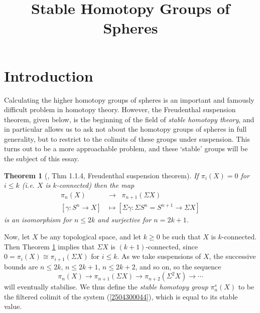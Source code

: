 \documentclass[11pt, titlepage]{article} %
\title{Stable Homotopy Groups of Spheres}
\date{}
\numberwithin{equation}{subsection}
\theoremstyle{plain}
\newtheorem{theorem}{Theorem}[subsection]
\theoremstyle{definition}
\begin{document}
\maketitle


\DeclarePairedDelimiter{\norm}{\lVert}{\rVert} 
\DeclarePairedDelimiter{\abs}{\lvert}{\rvert} 
\DeclarePairedDelimiter{\ang}{\langle}{\rangle} 


\section{Introduction}

Calculating the higher homotopy groups of spheres is an important and famously difficult problem in homotopy theory. However, the Freudenthal suspension theorem, given below, is the beginning of the field of \textit{stable homotopy theory}, and in particular allows us to ask not about the homotopy groups of spheres in full generality, but to restrict to the colimits of these groups under suspension. This turns out to be a more approachable problem, and these `stable' groups will be the subject of this essay. 

\begin{theorem}[{\autocite{cobordism}, Thm 1.1.4}, Freudenthal suspension theorem]\label{2504151046}
If \(\pi_i(X)=0\) for \(i\leq k\) (i.e. \(X\) is \(k\)-connected) then the map 
\begin{align*}
\pi_n(X) \;\;&\to\;\; \pi_{n+1}(\Sigma X)\\
[\gamma : S^n \to X] &\mapsto [\Sigma \gamma : \Sigma S^n=S^{n+1} \to \Sigma X]
\end{align*}
is an isomorphism for \(n \leq 2k\) and surjective for \(n=2k+1\).
\end{theorem}

Now, let \(X\) be any topological space, and let \(k\geq 0\) be such that \(X\) is \(k\)-connected. Then Theorem \ref{2504151046} implies that \(\Sigma X\) is \((k+1)\)-connected, since \(0=\pi_i(X)\cong \pi_{i+1}(\Sigma X)\) for \(i\leq k\). As we take suspensions of \(X\), the successive bounds are \(n \leq 2k\), \(n \leq 2k+1\), \(n\leq 2k+2\), and so on, so the sequence 
\begin{equation}\label{2504300044}
\pi_n(X)\to \pi_{n+1}(\Sigma X) \to \pi_{n+2}(\Sigma^2 X) \to \cdots
\end{equation}
will eventually stabilise. We thus define the \textit{stable homotopy group} \(\pi_n^s(X)\) to be the filtered colimit of the system (\ref{2504300044}), which is equal to its stable value. 
\end{document}
